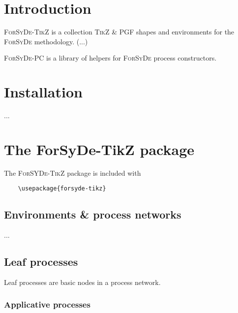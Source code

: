 \documentclass[10pt]{article}
\begin{document}
\maketitle

\begin{abstract}
This document is the reference manual for the \textsc{ForSyDe-TikZ} and \textsc{ForSyDe-PC} packages. A new feature in the library should be reflected and documented in this manual.
\end{abstract}

\section{Introduction}

\textsc{ForSyDe-TikZ} is a collection \textsc{TikZ} \& \textsc{PGF} shapes and environments for the \textsc{ForSyDe} methodology. (...)

\textsc{ForSyDe-PC} is a library of helpers for \textsc{ForSyDe} process constructors.

\section{Installation}

...


\section{The ForSyDe-TikZ package}

The \textsc{ForSYDe-TikZ} package is included with

\begin{verbatim}
	\usepackage{forsyde-tikz}
\end{verbatim}

\subsection{Environments \& process networks}

...

\subsection{Leaf processes}

Leaf processes are basic nodes in a process network.

\subsubsection{Applicative processes} \label{tikz_applicative}
\end{document}
